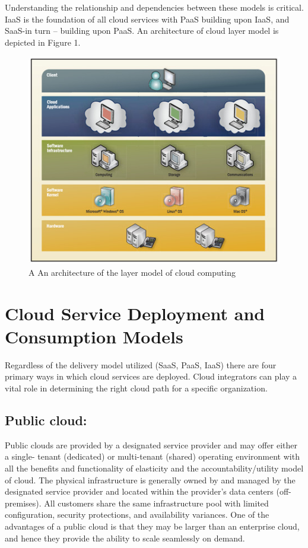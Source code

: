 \documentclass[11pt,a4paper]{report}
\begin{document}
Understanding the relationship and dependencies between these models is critical. IaaS is the foundation
of all cloud services with PaaS building upon IaaS, and SaaS-in turn – building upon PaaS. An
architecture of cloud layer model is depicted in Figure 1.
\begin{figure}
\begin{center}
\includegraphics[scale=0.5]{img.png}
  \caption{A An architecture of the layer model of cloud computing}
  \end{center}
 \end{figure} 
 \section{Cloud Service Deployment and Consumption Models}
 Regardless of the delivery model utilized (SaaS, PaaS, IaaS) there are four primary ways in which cloud
services are deployed. Cloud integrators can play a vital role in
determining the right cloud path for a specific organization.
 \subsection{Public cloud:}Public clouds are provided by a designated service provider and may offer either a single-
tenant (dedicated) or multi-tenant (shared) operating environment with all the benefits and functionality
of elasticity and the accountability/utility model of cloud. The physical infrastructure is generally owned
by and managed by the designated service provider and located within the provider’s data centers (off-
premises). All customers share the same infrastructure pool with limited configuration, security
protections, and availability variances. One of the advantages of a public cloud is that they may be larger
than an enterprise cloud, and hence they provide the ability to scale seamlessly on demand.
\end{document}
